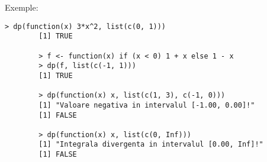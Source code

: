 \documentclass[12pt]{article}
\begin{document}
	Exemple:
	\begin{lstlisting}[numbers=none]
		> dp(function(x) 3*x^2, list(c(0, 1)))
		[1] TRUE
		
		> f <- function(x) if (x < 0) 1 + x else 1 - x
		> dp(f, list(c(-1, 1)))
		[1] TRUE
		
		> dp(function(x) x, list(c(1, 3), c(-1, 0)))
		[1] "Valoare negativa in intervalul [-1.00, 0.00]!"
		[1] FALSE
		
		> dp(function(x) x, list(c(0, Inf)))
		[1] "Integrala divergenta in intervalul [0.00, Inf]!"
		[1] FALSE
	\end{lstlisting}
	
\end{document}
